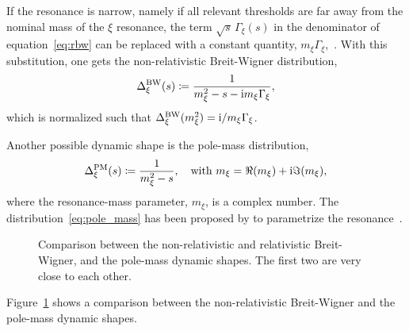    If the resonance is narrow, namely if all relevant thresholds are far away from the nominal mass of the $\xi$ resonance, the term $\sqrt{s}\,\Gamma_\xi(s)$ in the denominator of equation~\eqref{eq:rbw} can be replaced with a constant quantity, $m_{\xi}\Gamma_{\xi}$,~\cite[\S~47.2.1]{chinese_phisics}.
    With this substitution, one gets the non-relativistic Breit-Wigner distribution,
    \begin{equation}\label{eq:bw}
        \Delta_{\xi}^{\text{BW}}(s) \coloneqq \frac{1}{m_{\xi}^2 - s - \mathrm{i} m_{\xi} \Gamma_{\xi}},
    \end{equation}
    which is normalized such that $\Delta_{\xi}^{\text{BW}}(m_{\xi}^2) = \mathrm{i} / m_\xi\Gamma_\xi$.


    Another possible dynamic shape is the pole-mass distribution,
    \begin{equation}\label{eq:pole_mass}
        \Delta_{\xi}^{\text{PM}}(s) \coloneqq \frac{1}{m_{\xi}^2 - s},\quad
        \text{with }m_\xi = \Re (m_\xi) + \mathrm{i}\Im(m_\xi),
    \end{equation}
    where the resonance-mass parameter, $m_\xi$, is a complex number.
    The distribution~\eqref{eq:pole_mass} has been proposed by \citeauthor{PhysRevD.71.054030} to parametrize the \Psigma{} resonance~\cite{PhysRevD.71.054030}.
    \begin{figure}
        \centering
        
        \caption{Comparison between the non-relativistic and relativistic Breit-Wigner, and the pole-mass dynamic shapes.
                 The first two are very close to each other.
        }
        \label{fig:bw_pm_comparison}
    \end{figure}
    Figure~\ref{fig:bw_pm_comparison} shows a comparison between the non-relativistic Breit-Wigner and the pole-mass dynamic shapes.

